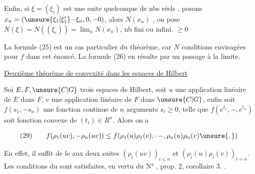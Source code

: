 
 Enfin, si $\xi=(\xi_i)$ est une suite quelconque de nbs réels , posons $x_n=(\unsure{\xi_1|\xi'_1}\mathord{-}\xi_n,0,\mathord{-}0)$, alors $N(x_n)$ ,  on pose $N(\xi)=N((\xi_i))=\lim_n N(x_n)$, nb fini ou infini. $\geq0$

 La formule (25) est un cas particulier du théorème, car $N$  conditions envisagées pour $f$ dans cet énoncé. La formule (26) en résulte par un passage à la limite.

{\reversemarginpar{}}\uline{Deuxième théorème de convexité dans les espaces de Hilbert}

{\reversemarginpar{}}
Soi $E,F,\unsure{C|G}$ trois espaces de Hilbert, soit $u$ une application linéaire  de $E$ dans $F$,  $v$ une application linéaire  de $F$ dans $\unsure{C|G}$,  enfin soit $f(s_1,\mathord{-}s_n)$ une fonction continue  de $n$ arguments $s_i\geq0$, telle que  $f(e^{t_1},\mathord{-},e^{t_n})$ soit fonction convexe de $(t_i)\in R^n$. Alors on a

\[
\begin{array}{@{}l@{\qquad}l@{}}
(29)&\displaystyle f(\rho_1(uv),\mathord{-}\rho_n(uv))\leq f(\rho_1(u)\rho_1(v),\mathord{\cdot}\,\mathord{-},\rho_n(u)\rho_n(v)\unsure{,})
\end{array}
\]

En effet, il suffit de  le   aux deux suites $(\rho_i(uv))_{i\leq n}$ et $(\rho_i(u)\rho_i(v))_{i=n}$. Les conditions  du  sont satisfaites,  en vertu du N° , prop. 2, corollaire 3. .

